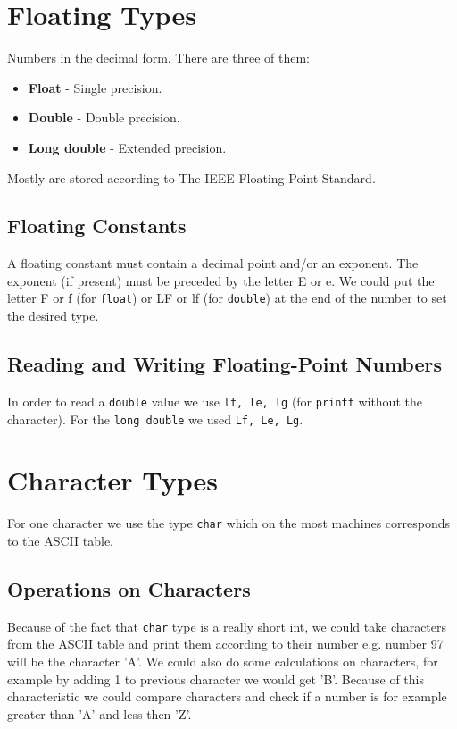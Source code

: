 \documentclass[openany]{book}
\begin{document}
    \section{Floating Types}
    Numbers in the decimal form. There are three of them:
    \begin{itemize}
        \item \textbf{Float} - Single precision.
        \item \textbf{Double} - Double precision.
        \item \textbf{Long double} - Extended precision.
    \end{itemize}
    Mostly are stored according to The IEEE Floating-Point Standard.

    \subsection*{Floating Constants}
    A floating constant must contain a decimal point and/or an exponent. The exponent
    (if present) must be preceded by the letter E or e. We could put the letter F or f
    (for \texttt{float}) or LF or lf (for \texttt{double}) at the end of the number to
    set the desired type.

    \subsection*{Reading and Writing Floating-Point Numbers}
    In order to read a \texttt{double} value we use \texttt{lf, le, lg} (for
    \texttt{printf} without the l character). For the \texttt{long double} we used
    \texttt{Lf, Le, Lg}.

    \section{Character Types}
    For one character we use the type \texttt{char} which on the most machines corresponds
    to the ASCII table.

    \subsection*{Operations on Characters}
    Because of the fact that \texttt{char} type is a really short int, we could take
    characters from the ASCII table and print them according to their number e.g. number
    97 will be the character 'A'. We could also do some calculations on characters, for
    example by adding 1 to previous character we would get 'B'. Because of this
    characteristic we could compare characters and check if a number is for example greater
    than 'A' and less then 'Z'.
\end{document}
